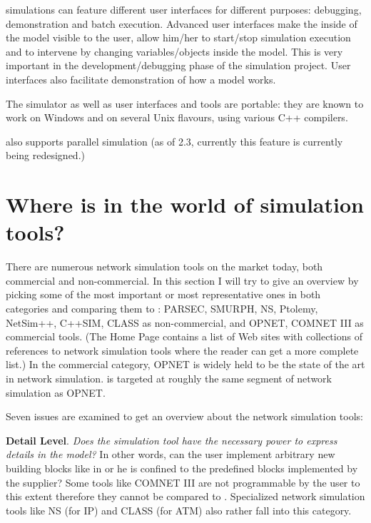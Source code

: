 {\opp} simulations can feature different user interfaces for
different purposes: debugging, demonstration and batch execution.
Advanced user interfaces make the inside of the model visible
to the user, allow him/her to start/stop simulation execution
and to intervene by changing variables/objects inside the model.
This is very important in the development/debugging phase
of the simulation project. User interfaces also facilitate demonstration
of how a model works.

The simulator as well as user interfaces and tools are portable:
they are known to work on Windows and on several Unix flavours,
using various C++ compilers.

{\opp} also supports parallel simulation (as of {\opp} 2.3,
currently this feature is currently being redesigned.)




\section{Where is {\opp} in the world of simulation tools?}

There are numerous network simulation tools on the market today,
both commercial and non-commercial. In this section I will try
to give an overview by picking some of the most important or
most representative ones in both categories and comparing them
to {\opp}: PARSEC, SMURPH, NS, Ptolemy, NetSim++, C++SIM, CLASS
as non-commercial, and OPNET, COMNET III as commercial tools.
(The {\opp} Home Page contains a list of Web sites with collections
of references to network simulation tools where the reader can
get a more complete list.) In the commercial category, OPNET
is widely held to be the state of the art in network simulation.
{\opp} is targeted at roughly the same segment of network simulation
as OPNET.{\nobreakspace}


Seven issues are examined to get an overview about the network
simulation tools:


\textbf{Detail Level}. \textit{Does the simulation tool have the necessary
power to express details in the model?} In other words, can the
user implement arbitrary new building blocks like in {\opp}
or he is confined to the predefined blocks implemented by the
supplier? Some tools like COMNET III are not programmable by
the user to this extent therefore they cannot be compared to
{\opp}. Specialized network simulation tools like NS (for IP)
and CLASS (for ATM) also rather fall into this category.


